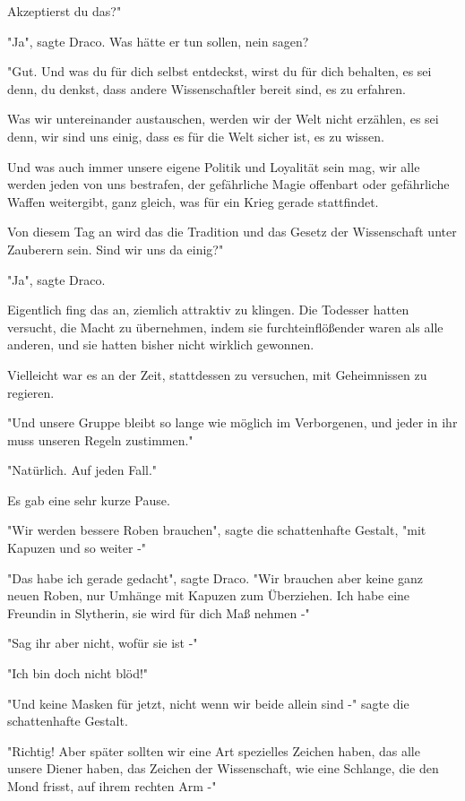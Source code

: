 {Akzeptierst du das?"

"Ja", sagte Draco. Was hätte er tun sollen, nein sagen?

"Gut. Und was du für dich selbst entdeckst, wirst du für dich behalten, es sei denn, du denkst, dass andere Wissenschaftler bereit sind, es zu erfahren.

Was wir untereinander austauschen, werden wir der Welt nicht erzählen, es sei denn, wir sind uns einig, dass es für die Welt sicher ist, es zu wissen.

Und was auch immer unsere eigene Politik und Loyalität sein mag, wir alle werden jeden von uns bestrafen, der gefährliche Magie offenbart oder gefährliche Waffen weitergibt, ganz gleich, was für ein Krieg gerade stattfindet.

Von diesem Tag an wird das die Tradition und das Gesetz der Wissenschaft unter Zauberern sein. Sind wir uns da einig?"

"Ja", sagte Draco.

Eigentlich fing das an, ziemlich attraktiv zu klingen. Die Todesser hatten versucht, die Macht zu übernehmen, indem sie furchteinflößender waren als alle anderen, und sie hatten bisher nicht wirklich gewonnen.

Vielleicht war es an der Zeit, stattdessen zu versuchen, mit Geheimnissen zu regieren.

"Und unsere Gruppe bleibt so lange wie möglich im Verborgenen, und jeder in ihr muss unseren Regeln zustimmen."

"Natürlich. Auf jeden Fall."

Es gab eine sehr kurze Pause.

"Wir werden bessere Roben brauchen", sagte die schattenhafte Gestalt, "mit Kapuzen und so weiter -"

"Das habe ich gerade gedacht", sagte Draco. "Wir brauchen aber keine ganz neuen Roben, nur Umhänge mit Kapuzen zum Überziehen. Ich habe eine Freundin in Slytherin, sie wird für dich Maß nehmen -"

"Sag ihr aber nicht, wofür sie ist -"

"Ich bin doch nicht blöd!"

"Und keine Masken für jetzt, nicht wenn wir beide allein sind -" sagte die schattenhafte Gestalt.

"Richtig! Aber später sollten wir eine Art spezielles Zeichen haben, das alle unsere Diener haben, das Zeichen der Wissenschaft, wie eine Schlange, die den Mond frisst, auf ihrem rechten Arm -"

}
